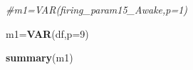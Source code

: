 \documentclass[
]{article}
\newenvironment{Shaded}{\begin{snugshade}}{\end{snugshade}}
\newcommand{\AttributeTok}[1]{\textcolor[rgb]{0.13,0.29,0.53}{#1}}
\newcommand{\CommentTok}[1]{\textcolor[rgb]{0.56,0.35,0.01}{\textit{#1}}}
\newcommand{\DecValTok}[1]{\textcolor[rgb]{0.00,0.00,0.81}{#1}}
\newcommand{\FunctionTok}[1]{\textcolor[rgb]{0.13,0.29,0.53}{\textbf{#1}}}
\newcommand{\NormalTok}[1]{#1}
\newcommand{\OtherTok}[1]{\textcolor[rgb]{0.56,0.35,0.01}{#1}}
\begin{document}
\begin{Shaded}
\begin{Highlighting}[]
\CommentTok{\#m1=VAR(firing\_param15\_Awake,p=1)}
\end{Highlighting}
\end{Shaded}

\begin{Shaded}
\begin{Highlighting}[]
\NormalTok{m1}\OtherTok{=}\FunctionTok{VAR}\NormalTok{(df,}\AttributeTok{p=}\DecValTok{9}\NormalTok{)}
\end{Highlighting}
\end{Shaded}

\begin{Shaded}
\begin{Highlighting}[]
\FunctionTok{summary}\NormalTok{(m1)}
\end{Highlighting}
\end{Shaded}
\end{document}
